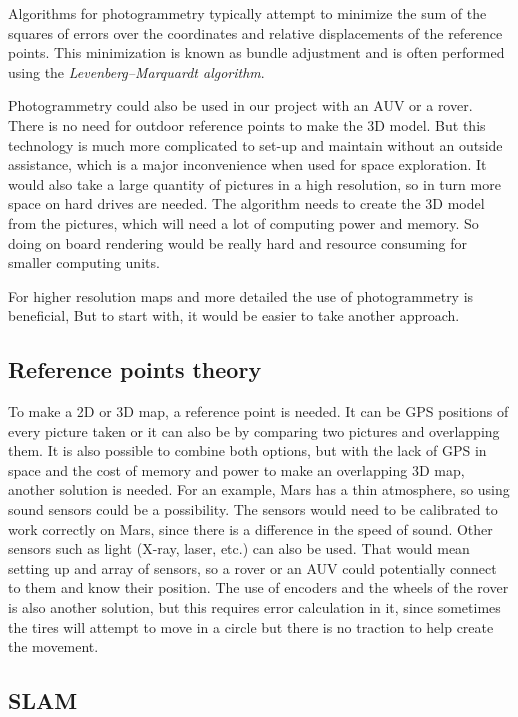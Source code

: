 Algorithms for photogrammetry typically attempt to minimize the sum of the squares of errors over the coordinates and relative displacements of the reference points. This minimization is known as bundle adjustment and is often performed using the \textit{Levenberg–Marquardt algorithm}\cite{photo}.

Photogrammetry could also be used in our project with an AUV or a rover. There is no need for outdoor reference points to make the 3D model. But this technology is much more complicated to set-up and maintain without an outside assistance, which is a major inconvenience when used for space exploration. It would also take a large quantity of pictures in a high resolution, so in turn more space on hard drives are needed. The algorithm needs to create the 3D model from the pictures, which will need a lot of computing power and memory. So doing on board rendering would be really hard and resource consuming for smaller computing units.

For higher resolution maps and more detailed the use of photogrammetry is beneficial, But to start with, it would be easier to take another approach. %

\subsection{Reference points theory}

To make a 2D or 3D map, a reference point is needed. It can be GPS positions of every picture taken or it can also be by comparing two pictures and overlapping them. It is also possible to combine both options, but with the lack of GPS in space and the cost of memory and power to make an overlapping 3D map, another solution is needed. For an example, Mars has a thin atmosphere, so using sound sensors could be a possibility. The sensors would need to be calibrated to work correctly on Mars, since there is a difference in the speed of sound. Other sensors such as light (X-ray, laser, etc.) can also be used. That would mean setting up and array of sensors, so a rover or an AUV could potentially connect to them and know their position. The use of encoders and the wheels of the rover is also another solution, but this requires error calculation in it, since sometimes the tires will attempt to move in a circle but there is no traction to help create the movement\cite{reference}.

\subsection{SLAM}

